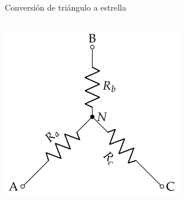 \documentclass[aspectratio=169, xcolor={usenames,svgnames,dvipsnames}]{beamer}
\begin{document}
\begin{frame}{Conversión de triángulo a estrella}
\begin{columns}
    \begin{column}{0.3\columnwidth}
    \begin{center}
    \includegraphics[width=.9\linewidth]{../figs/Conexion_Estrella.pdf}
    \end{center}
    \end{column}
    \end{columns}
\end{frame}

\end{document}
